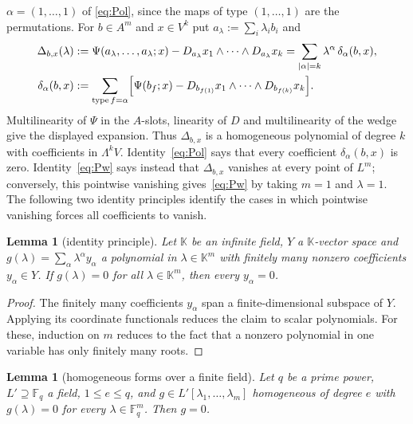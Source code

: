 \documentclass[11pt]{amsart}
\newtheorem{lemma}[theorem]{Lemma}
\theoremstyle{definition}
\theoremstyle{remark}
\numberwithin{equation}{section}
\newcommand{\F}{\mathbb F}
\newcommand{\abs}[1]{\lvert #1\rvert}
\newcommand{\type}{\operatorname{type}}
\begin{document}
$\alpha=(1,\dots,1)$ of \eqref{eq:Pol}, since the maps of type $(1,\dots,1)$ are the permutations. For $b\in A^m$ and
$x\in V^k$ put $a_\lambda:=\sum_i\lambda_ib_i$ and
\begin{align*}
\Delta_{b,x}(\lambda)&:=\Psi(a_\lambda,\dots,a_\lambda;x)-D_{a_\lambda}x_1\wedge\dots\wedge D_{a_\lambda}x_k
=\sum_{\abs\alpha=k}\lambda^\alpha\,\delta_\alpha(b,x),\\
\delta_\alpha(b,x)&:=\sum_{\type f=\alpha}\Bigl[\Psi(b_f;x)-D_{b_{f(1)}}x_1\wedge\dots\wedge D_{b_{f(k)}}x_k\Bigr].
\end{align*}
Multilinearity of $\Psi$ in the $A$\nobreakdash-slots, linearity of $D$ and multilinearity of the wedge give the displayed
expansion. Thus $\Delta_{b,x}$ is a homogeneous polynomial of degree $k$ with coefficients in $\Lambda^kV$.
Identity~\eqref{eq:Pol} says that every coefficient $\delta_\alpha(b,x)$ is zero. Identity~\eqref{eq:Pw} says instead that
$\Delta_{b,x}$ vanishes at every point of $L^m$; conversely, this pointwise vanishing gives~\eqref{eq:Pw} by taking
$m=1$ and $\lambda=1$. The following two identity principles identify the cases in which pointwise vanishing forces
all coefficients to vanish.

\begin{lemma}[identity principle]\label{lem:idprinc}
Let $\mathbb K$ be an infinite field, $Y$ a $\mathbb K$\nobreakdash-vector space and $g(\lambda)=\sum_\alpha\lambda^\alpha y_\alpha$ a
polynomial in $\lambda\in\mathbb K^m$ with finitely many nonzero coefficients $y_\alpha\in Y$. If $g(\lambda)=0$ for all
$\lambda\in\mathbb K^m$, then every $y_\alpha=0$.
\end{lemma}

\begin{proof}
The finitely many coefficients $y_\alpha$ span a finite-dimensional subspace of $Y$. Applying its coordinate
functionals reduces the claim to scalar polynomials. For these, induction on $m$ reduces to the fact that a nonzero
polynomial in one variable has only finitely many roots.
\end{proof}

\begin{lemma}[homogeneous forms over a finite field]\label{lem:forms}
Let $q$ be a prime power, $L'\supseteq\F_q$ a field, $1\le e\le q$, and $g\in L'[\lambda_1,\dots,\lambda_m]$ homogeneous of
degree $e$ with $g(\lambda)=0$ for every $\lambda\in\F_q^m$. Then $g=0$.
\end{lemma}
\end{document}
